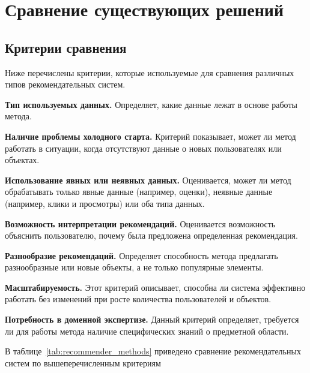 \chapter{Сравнение существующих решений}


\section{Критерии сравнения}

Ниже перечислены критерии, которые используемые для сравнения различных типов рекомендательных систем.

\textbf{Тип используемых данных.} Определяет, какие данные лежат в основе работы метода.

\textbf{Наличие проблемы холодного старта.} Критерий показывает, может ли метод работать в ситуации, когда отсутствуют
данные о новых пользователях или объектах.

\textbf{Использование явных или неявных данных.} Оценивается, может ли метод обрабатывать только явные данные (например, оценки),
неявные данные (например, клики и просмотры) или оба типа данных.

\textbf{Возможность интерпретации рекомендаций.} Оценивается возможность объяснить пользователю,
почему была предложена определенная рекомендация.

\textbf{Разнообразие рекомендаций.} Определяет способность метода предлагать разнообразные
или новые объекты, а не только популярные элементы.

\textbf{Масштабируемость.} Этот критерий описывает, способна ли система эффективно работать
без изменений при росте количества пользователей и объектов.

\textbf{Потребность в доменной экспертизе.} Данный критерий определяет, требуется
ли для работы метода наличие специфических знаний о предметной области.

В таблице~\ref{tab:recommender_methods} приведено сравнение рекомендательных
систем по вышеперечисленным критериям

